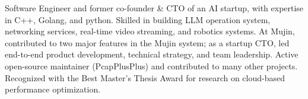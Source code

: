 

\begin{cvparagraph}

Software Engineer and former co-founder \& CTO of an AI startup, with expertise in C++, Golang, and python.
Skilled in building LLM operation system, networking services, real-time video streaming, and robotics systems.
At Mujin, contributed to two major features in the Mujin system;
as a startup CTO, led end-to-end product development, technical strategy, and team leadership. 
Active open-source maintainer (PcapPlusPlus) and contributed to many other projects.
Recognized with the Best Master’s Thesis Award for research on cloud-based performance optimization.
\end{cvparagraph}
